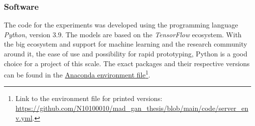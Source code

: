 \subsubsection{Software}
The code for the experiments was developed using the programming language \textit{Python}, version $3.9$. The models are based on the \textit{TensorFlow} ecosystem. With the big ecosystem and support for machine learning and the research community around it, the ease of use and possibility for rapid prototyping, Python is a good choice for a project of this scale. The exact packages and their respective versions can be found in the \href{https://github.com/N10100010/mad_gan_thesis/blob/main/code/server_env.yml}{Anaconda environment file}\footnote{Link to the environment file for printed versions: \url{https://github.com/N10100010/mad_gan_thesis/blob/main/code/server_env.yml}.}.



\newpage
